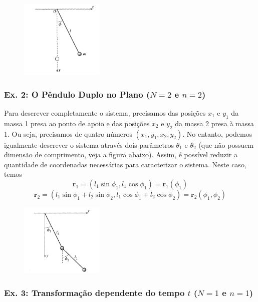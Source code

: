 \documentclass{article}
\begin{document}
\begin{figure}[h]
\centering
\includegraphics[width=4cm]{pendulum.png}
\end{figure}

\subsubsection*{Ex. 2: O Pêndulo Duplo no Plano ($N = 2$ e $n=2$)}

Para descrever completamente o sistema, precisamos das posições $x_1$ e $y_1$ da massa 1 presa ao ponto de apoio e das posições $x_2$ e $y_2$ da massa 2 presa à massa 1. Ou seja, precisamos de quatro números $(x_1,y_1,x_2,y_2)$. No entanto, podemos igualmente descrever o sistema através dois parâmetros $\theta_1$ e $\theta_2$ (que não possuem dimensão de comprimento, veja a figura abaixo). Assim, é possível reduzir a quantidade de coordenadas necessárias para caracterizar o sistema. Neste caso, temos 
\begin{equation}
    \mathbf{r}_1 = (l_1\sin\phi_1,l_1\cos\phi_1) = \mathbf{r}_1(\phi_1)
\end{equation}
\begin{equation}
    \mathbf{r}_2 = (l_1\sin\phi_1 + l_2\sin\phi_2,l_1\cos\phi_1+l_2\cos\phi_2) = \mathbf{r}_2(\phi_1,\phi_2)
\end{equation}

\begin{figure}[h]
\centering
\includegraphics[width=4cm]{doublep.png}
\end{figure}

\subsubsection*{Ex. 3: Transformação dependente do tempo $t$ ($N = 1$ e $n=1$)}
\end{document}
